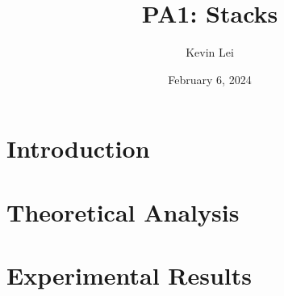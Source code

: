 \documentclass{article}
\title{PA1: Stacks}
\author{Kevin Lei}
\date{February 6, 2024}
\begin{document}
\maketitle

\section{Introduction}



\section{Theoretical Analysis}



\section{Experimental Results}
\end{document}
